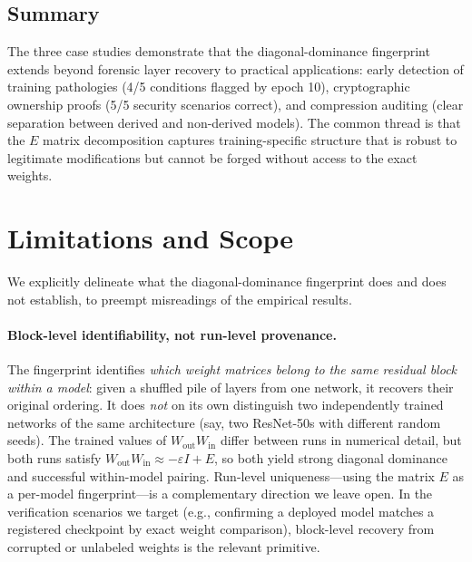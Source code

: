 \documentclass[wcp]{jmlr}
\begin{document}
\subsection{Summary}

The three case studies demonstrate that the diagonal-dominance fingerprint extends beyond forensic layer recovery to practical applications: early detection of training pathologies (4/5 conditions flagged by epoch 10), cryptographic ownership proofs (5/5 security scenarios correct), and compression auditing (clear separation between derived and non-derived models). The common thread is that the $E$ matrix decomposition captures training-specific structure that is robust to legitimate modifications but cannot be forged without access to the exact weights.

\section{Limitations and Scope}\label{sec:limitations}

We explicitly delineate what the diagonal-dominance fingerprint does and does not establish, to preempt misreadings of the empirical results.

\paragraph{Block-level identifiability, not run-level provenance.}
The fingerprint identifies \emph{which weight matrices belong to the same residual block within a model}: given a shuffled pile of layers from one network, it recovers their original ordering. It does \emph{not} on its own distinguish two independently trained networks of the same architecture (say, two ResNet-50s with different random seeds). The trained values of $W_{\mathrm{out}}W_{\mathrm{in}}$ differ between runs in numerical detail, but both runs satisfy $W_{\mathrm{out}}W_{\mathrm{in}} \approx -\varepsilon I + E$, so both yield strong diagonal dominance and successful within-model pairing. Run-level uniqueness---using the matrix $E$ as a per-model fingerprint---is a complementary direction we leave open. In the verification scenarios we target (e.g., confirming a deployed model matches a registered checkpoint by exact weight comparison), block-level recovery from corrupted or unlabeled weights is the relevant primitive.
\end{document}
